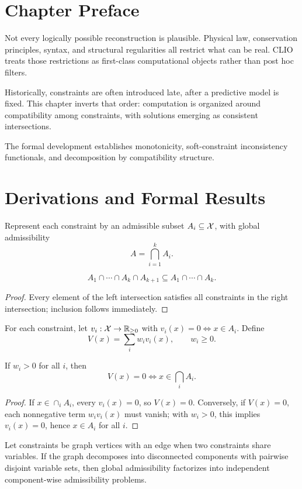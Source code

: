 \section{Chapter Preface}
Not every logically possible reconstruction is plausible. Physical law, conservation principles, syntax, and structural regularities all restrict what can be real. CLIO treats those restrictions as first-class computational objects rather than post hoc filters.

Historically, constraints are often introduced late, after a predictive model is fixed. This chapter inverts that order: computation is organized around compatibility among constraints, with solutions emerging as consistent intersections.

The formal development establishes monotonicity, soft-constraint inconsistency functionals, and decomposition by compatibility structure.

\section{Derivations and Formal Results}
Represent each constraint by an admissible subset \(A_i\subseteq\mathcal{X}\), with global admissibility
\[
A=\bigcap_{i=1}^k A_i.
\]

\begin{proposition}
\[
A_1\cap\cdots\cap A_k\cap A_{k+1}\subseteq A_1\cap\cdots\cap A_k.
\]
\end{proposition}

\begin{proof}
Every element of the left intersection satisfies all constraints in the right intersection; inclusion follows immediately.
\end{proof}

\begin{definition}
For each constraint, let \(v_i:\mathcal{X}\to\mathbb R_{\ge0}\) with \(v_i(x)=0\iff x\in A_i\). Define
\[
V(x)=\sum_i w_i v_i(x),\qquad w_i\ge0.
\]
\end{definition}

\begin{proposition}
If \(w_i>0\) for all \(i\), then
\[
V(x)=0\iff x\in\bigcap_i A_i.
\]
\end{proposition}

\begin{proof}
If \(x\in\cap_iA_i\), every \(v_i(x)=0\), so \(V(x)=0\). Conversely, if \(V(x)=0\), each nonnegative term \(w_iv_i(x)\) must vanish; with \(w_i>0\), this implies \(v_i(x)=0\), hence \(x\in A_i\) for all \(i\).
\end{proof}

\begin{theorem}
Let constraints be graph vertices with an edge when two constraints share variables. If the graph decomposes into disconnected components with pairwise disjoint variable sets, then global admissibility factorizes into independent component-wise admissibility problems.
\end{theorem}
